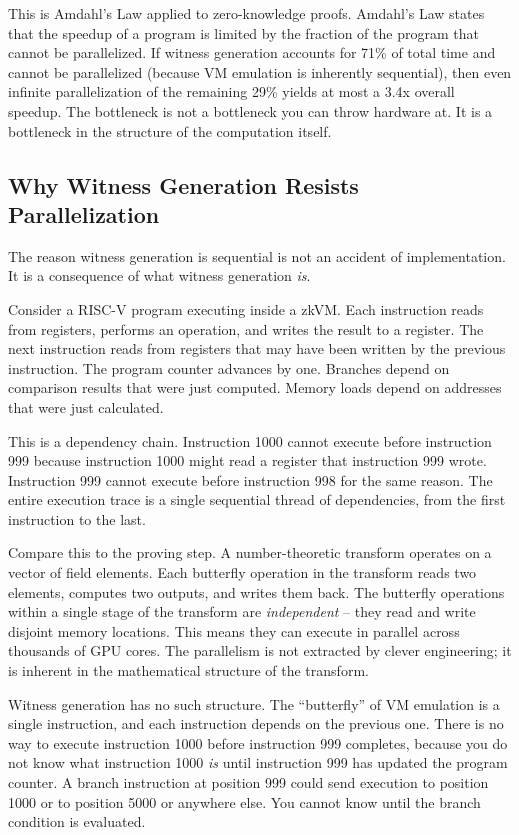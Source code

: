 \documentclass[
  11pt,
  openany]{report}
\begin{document}
This is Amdahl's Law applied to zero-knowledge proofs. Amdahl's Law states that
the speedup of a program is limited by the fraction of the program that cannot
be parallelized. If witness generation accounts for 71\% of total time and
cannot be parallelized (because VM emulation is inherently sequential), then
even infinite parallelization of the remaining 29\% yields at most a 3.4x
overall speedup. The bottleneck is not a bottleneck you can throw hardware at.
It is a bottleneck in the structure of the computation itself.

\subsection{Why Witness Generation Resists
Parallelization}\label{why-witness-generation-resists-parallelization}

The reason witness generation is sequential is not an accident of
implementation. It is a consequence of what witness generation \emph{is}.

Consider a RISC-V program executing inside a zkVM. Each instruction reads from
registers, performs an operation, and writes the result to a register. The next
instruction reads from registers that may have been written by the previous
instruction. The program counter advances by one. Branches depend on comparison
results that were just computed. Memory loads depend on addresses that were just
calculated.

This is a dependency chain. Instruction 1000 cannot execute before instruction
999 because instruction 1000 might read a register that instruction 999 wrote.
Instruction 999 cannot execute before instruction 998 for the same reason. The
entire execution trace is a single sequential thread of dependencies, from the
first instruction to the last.

Compare this to the proving step. A number-theoretic transform operates on a
vector of field elements. Each butterfly operation in the transform reads two
elements, computes two outputs, and writes them back. The butterfly operations
within a single stage of the transform are \emph{independent} -- they read and
write disjoint memory locations. This means they can execute in parallel across
thousands of GPU cores. The parallelism is not extracted by clever engineering;
it is inherent in the mathematical structure of the transform.

Witness generation has no such structure. The ``butterfly'' of VM emulation is a
single instruction, and each instruction depends on the previous one. There is
no way to execute instruction 1000 before instruction 999 completes, because you
do not know what instruction 1000 \emph{is} until instruction 999 has updated
the program counter. A branch instruction at position 999 could send execution
to position 1000 or to position 5000 or anywhere else. You cannot know until the
branch condition is evaluated.
\end{document}
